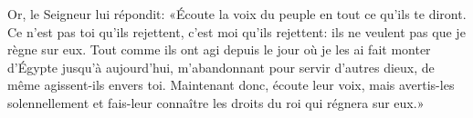 Or, le Seigneur lui répondit:
	«Écoute la voix du peuple en tout ce qu’ils te diront.
Ce n’est pas toi qu’ils rejettent, c’est moi qu’ils rejettent:
	ils ne veulent pas que je règne sur eux.
Tout comme ils ont agi
		depuis le jour où je les ai fait monter d’Égypte jusqu’à aujourd’hui,
	m’abandonnant pour servir d’autres dieux,
	de même agissent-ils envers toi.
Maintenant donc, écoute leur voix, mais avertis-les solennellement
	et fais-leur connaître les droits du roi qui régnera sur eux.»

